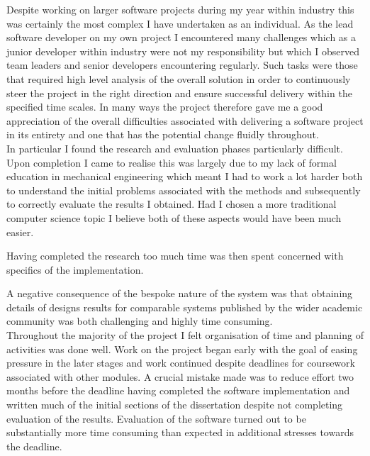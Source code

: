 \noindent
Despite working on larger software projects during my year within industry this was certainly the most complex I have undertaken as an individual. As the lead software developer on my own project I encountered many challenges which as a junior developer within industry were not my responsibility but which I observed team leaders and senior developers encountering regularly. Such tasks were those that required high level analysis of the overall solution in order to continuously steer the project in the right direction and ensure successful delivery within the specified time scales. In many ways the project therefore gave me a good appreciation of the overall difficulties associated with delivering a software project in its entirety and one that has the potential change fluidly throughout.\\ 

\noindent
In particular I found the research and evaluation phases particularly difficult. Upon completion I came to realise this was largely due to my lack of formal education in mechanical engineering which meant I had to work a lot harder both to understand the initial problems associated with the methods and subsequently to correctly evaluate the results I obtained. Had I chosen a more traditional computer science topic I believe both of these aspects would have been much easier.

Having completed the research too much time was then spent concerned with specifics of the implementation. 




A negative consequence of the bespoke nature of the system was that obtaining details of designs results for comparable systems published by the wider academic community was both challenging and highly time consuming.  \\ 

\noindent
Throughout the majority of the project I felt organisation of time and planning of activities was done well. Work on the project began early with the goal of easing pressure in the later stages and work continued despite deadlines for coursework associated with other modules. A crucial mistake made was to reduce effort two months before the deadline having completed the software implementation and written much of the initial sections of the dissertation despite not completing evaluation of the results. Evaluation of the software turned out to be substantially more time consuming than expected in additional stresses towards the deadline. \\

